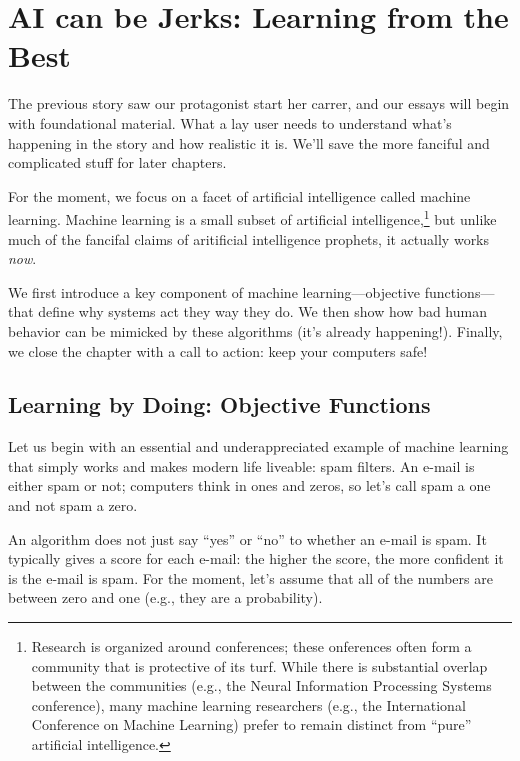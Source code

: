 
\newcommand{\salesjerk}[0]{Levi}

\chapter{AI can be Jerks: Learning from the Best}

The previous story saw our protagonist start her carrer, and our
essays will begin with foundational material.  What a lay user needs
to understand what's happening in the story and how realistic it is.
We'll save the more fanciful and complicated stuff for later chapters.

For the moment, we focus on a facet of artificial intelligence called
machine learning.  Machine learning is a small subset of artificial
intelligence,\footnote{Research is organized around conferences; these
  onferences often form a community that is protective of its turf.
  While there is substantial overlap between the communities (e.g.,
  the Neural Information Processing Systems conference), many machine
  learning researchers (e.g., the International Conference on Machine
  Learning) prefer to remain distinct from ``pure'' artificial
  intelligence.} but unlike much of the fancifal claims of aritificial
intelligence prophets, it actually works \emph{now}.

We first introduce a key component of machine learning---objective
functions---that define why systems act they way they do. We then show
how bad human behavior can be mimicked by these algorithms (it's
already happening!).  Finally, we close the chapter with a call to
action: keep your computers safe!

\section{Learning by Doing: Objective Functions}

Let us begin with an essential and underappreciated example of machine
learning that simply works and makes modern life liveable: spam
filters.  An e-mail is either spam or not; computers think in ones and
zeros, so let's call spam a one and not spam a zero.

An algorithm does not just say ``yes'' or ``no'' to whether an e-mail
is spam.  It typically gives a score for each e-mail: the higher the
score, the more confident it is the e-mail is spam.  For the moment,
let's assume that all of the numbers are between zero and one (e.g.,
they are a probability).

